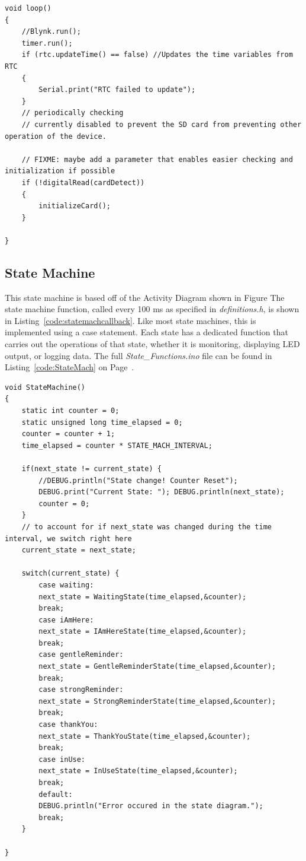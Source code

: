 \documentclass{article}
\begin{document}
\begin{lstlisting}[caption={The Main Loop}, label={code:mainloop}]
void loop()
{
	//Blynk.run();
	timer.run(); 
	if (rtc.updateTime() == false) //Updates the time variables from RTC
	{
		Serial.print("RTC failed to update");
	}
	// periodically checking 
	// currently disabled to prevent the SD card from preventing other operation of the device.
	
	// FIXME: maybe add a parameter that enables easier checking and initialization if possible
	if (!digitalRead(cardDetect))
	{
		initializeCard(); 
	}

}
\end{lstlisting}

\subsection{State Machine}
This state machine is based off of the Activity Diagram shown in Figure %
The state machine function, called every 100 ms as specified in \textit{definitions.h}, is shown in Listing~\ref{code:statemachcallback}. Like most state machines, this is implemented using a case statement. Each state has a dedicated function that carries out the operations of that state, whether it is monitoring, displaying LED output, or logging data. The full \textit{State\_Functions.ino} file can be found in Listing~\ref{code:StateMach} on Page~\pageref{code:StateMach}. 

\begin{lstlisting}[caption={The State Machine Callback Function}, label={code:statemachcallback}]
void StateMachine()
{ 
	static int counter = 0; 
	static unsigned long time_elapsed = 0; 
	counter = counter + 1;
	time_elapsed = counter * STATE_MACH_INTERVAL;  
	
	if(next_state != current_state) {
		//DEBUG.println("State change! Counter Reset"); 
		DEBUG.print("Current State: "); DEBUG.println(next_state); 
		counter = 0; 
	}
	// to account for if next_state was changed during the time interval, we switch right here
	current_state = next_state; 
	
	switch(current_state) {
		case waiting: 
		next_state = WaitingState(time_elapsed,&counter); 
		break; 
		case iAmHere: 
		next_state = IAmHereState(time_elapsed,&counter); 
		break; 
		case gentleReminder: 
		next_state = GentleReminderState(time_elapsed,&counter); 
		break;
		case strongReminder:
		next_state = StrongReminderState(time_elapsed,&counter); 
		break; 
		case thankYou: 
		next_state = ThankYouState(time_elapsed,&counter); 
		break;
		case inUse:
		next_state = InUseState(time_elapsed,&counter);
		break;
		default: 
		DEBUG.println("Error occured in the state diagram."); 
		break;     
	}

}
\end{lstlisting}
\end{document}
